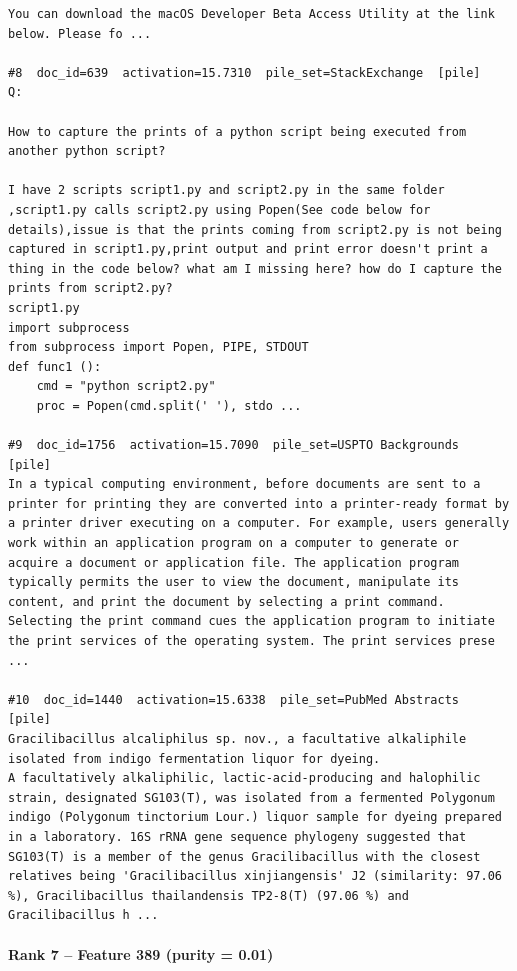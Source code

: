 \begin{verbatim}
You can download the macOS Developer Beta Access Utility at the link below. Please fo ...

#8  doc_id=639  activation=15.7310  pile_set=StackExchange  [pile]
Q:

How to capture the prints of a python script being executed from another python script?

I have 2 scripts script1.py and script2.py in the same folder ,script1.py calls script2.py using Popen(See code below for details),issue is that the prints coming from script2.py is not being captured in script1.py,print output and print error doesn't print a thing in the code below? what am I missing here? how do I capture the prints from script2.py?
script1.py
import subprocess
from subprocess import Popen, PIPE, STDOUT
def func1 ():
    cmd = "python script2.py"
    proc = Popen(cmd.split(' '), stdo ...

#9  doc_id=1756  activation=15.7090  pile_set=USPTO Backgrounds  [pile]
In a typical computing environment, before documents are sent to a printer for printing they are converted into a printer-ready format by a printer driver executing on a computer. For example, users generally work within an application program on a computer to generate or acquire a document or application file. The application program typically permits the user to view the document, manipulate its content, and print the document by selecting a print command. Selecting the print command cues the application program to initiate the print services of the operating system. The print services prese ...

#10  doc_id=1440  activation=15.6338  pile_set=PubMed Abstracts  [pile]
Gracilibacillus alcaliphilus sp. nov., a facultative alkaliphile isolated from indigo fermentation liquor for dyeing.
A facultatively alkaliphilic, lactic-acid-producing and halophilic strain, designated SG103(T), was isolated from a fermented Polygonum indigo (Polygonum tinctorium Lour.) liquor sample for dyeing prepared in a laboratory. 16S rRNA gene sequence phylogeny suggested that SG103(T) is a member of the genus Gracilibacillus with the closest relatives being 'Gracilibacillus xinjiangensis' J2 (similarity: 97.06 %), Gracilibacillus thailandensis TP2-8(T) (97.06 %) and Gracilibacillus h ...

\end{verbatim}

\paragraph*{Rank 7 -- Feature 389 (purity = 0.01)}

